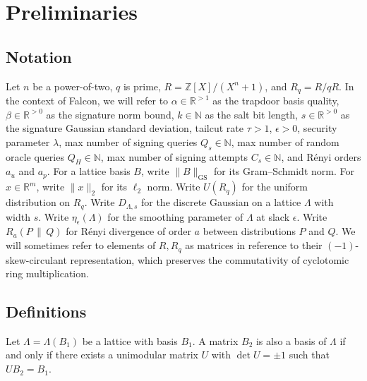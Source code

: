 \section{Preliminaries}

\subsection{Notation}

Let $n$ be a power-of-two, $q$ is prime, $R = \mathbb{Z}[X]/(X^n + 1)$, and $R_q = R/qR$. 
In the context of Falcon, we will refer to $\alpha \in \mathbb{R}^{>1}$ as the trapdoor 
basis quality, $\beta \in \mathbb{R}^{>0}$ as the signature norm bound, $k \in \mathbb{N}$
as the salt bit length,  $s \in \mathbb{R}^{>0}$ as the signature Gaussian standard deviation, 
tailcut rate $\tau > 1$, $\epsilon > 0$, security parameter $\lambda$, max number of signing 
queries $Q_s \in \mathbb{N}$, max number of random oracle queries $Q_H \in \mathbb{N}$,
max number of signing attempts $C_s \in \mathbb{N}$, and R\'enyi orders $a_u$ and $a_p$.
For a lattice basis $B$, write $\|B\|_{\mathrm{GS}}$ for its Gram--Schmidt norm.
For $x \in \mathbb{R}^m$, write $\|x\|_2$ for its $\ell_2$ norm. Write $U(R_q)$ for the uniform 
distribution on $R_q$. Write $D_{\Lambda,s}$ for the discrete Gaussian on a lattice $\Lambda$ 
with width $s$. Write $\eta_\epsilon(\Lambda)$ for the smoothing parameter of $\Lambda$ at 
slack $\epsilon$. Write $R_a(P \,\|\, Q)$ for R\'enyi divergence of order $a$ between 
distributions $P$ and $Q$. We will sometimes refer to elements of $R, R_q$ as matrices in 
reference to their $(-1)$-skew-circulant representation, which preserves the commutativity 
of cyclotomic ring multiplication.

\subsection{Definitions}

\begin{definition}
Let $\Lambda = \Lambda(B_1)$ be a lattice with basis $B_1$.
A matrix $B_2$ is also a basis of $\Lambda$ if and only if there exists a unimodular matrix $U$ with $\det U = \pm 1$ such that $UB_2 = B_1$.
\end{definition}

